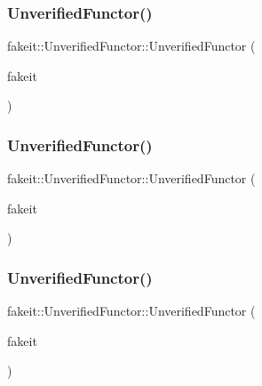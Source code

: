 \subsubsection{\texorpdfstring{UnverifiedFunctor()}{UnverifiedFunctor()}\hspace{0.1cm}{\footnotesize\ttfamily [6/9]}}
{\footnotesize\ttfamily fakeit\+::\+Unverified\+Functor\+::\+Unverified\+Functor (\begin{DoxyParamCaption}\item[{\mbox{\hyperlink{structfakeit_1_1FakeitContext}{Fakeit\+Context}} \&}]{fakeit }\end{DoxyParamCaption})\hspace{0.3cm}{\ttfamily [inline]}}

\mbox{\label{classfakeit_1_1UnverifiedFunctor_a5dcaec59e8d210db88b5600118e51426}} 
\subsubsection{\texorpdfstring{UnverifiedFunctor()}{UnverifiedFunctor()}\hspace{0.1cm}{\footnotesize\ttfamily [7/9]}}
{\footnotesize\ttfamily fakeit\+::\+Unverified\+Functor\+::\+Unverified\+Functor (\begin{DoxyParamCaption}\item[{\mbox{\hyperlink{structfakeit_1_1FakeitContext}{Fakeit\+Context}} \&}]{fakeit }\end{DoxyParamCaption})\hspace{0.3cm}{\ttfamily [inline]}}

\mbox{\label{classfakeit_1_1UnverifiedFunctor_a5dcaec59e8d210db88b5600118e51426}} 
\subsubsection{\texorpdfstring{UnverifiedFunctor()}{UnverifiedFunctor()}\hspace{0.1cm}{\footnotesize\ttfamily [8/9]}}
{\footnotesize\ttfamily fakeit\+::\+Unverified\+Functor\+::\+Unverified\+Functor (\begin{DoxyParamCaption}\item[{\mbox{\hyperlink{structfakeit_1_1FakeitContext}{Fakeit\+Context}} \&}]{fakeit }\end{DoxyParamCaption})\hspace{0.3cm}{\ttfamily [inline]}}

